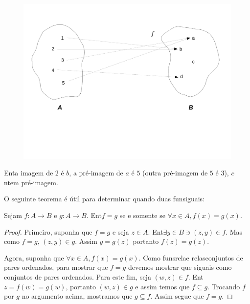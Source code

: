 \begin{figure}[h]
\begin{center}
\includegraphics[width=12cm,trim={0.9cm 6.4cm 0.9cm 2.7cm},clip]{./figuras/figure26.pdf}
\end{center}
\end{figure}

Ent\ao a imagem de $2$ \'e $b$, a pr\'e-imagem de $a$ \'e $5$ (outra pr\'e-imagem de $5$ \'e $3$), $c$ n\ao tem pr\'e-imagem.

O seguinte teorema \'e \'util para determinar quando duas fun\coes s\ao iguais:
\begin{teob}
Sejam $f:A\to B$ e $g:A\to B$. Ent\ao $f=g$ se e somente se $\forall x\in A, f(x)=g(x)$.
\end{teob}
\begin{proof}
Primeiro, suponha que $f=g$ e seja $z\in A$. Ent\ao $\exists y\in B\ni (z,y)\in f$. Mas como $f=g$, $(z,y)\in g$. Assim $y=g(z)$ portanto $f(z)=g(z)$.

Agora, suponha que $\forall x\in A, f(x)=g(x)$. Como fun\coes s\ao rela\coes e rela\coes s\ao conjuntos de pares ordenados, para mostrar que $f=g$ devemos mostrar que s\ao iguais como conjuntos de pares ordenados. Para este fim, seja $(w,z)\in f$. Ent\ao $z=f(w)=g(w)$, portanto $(w,z)\in g$ e assim temos que $f\subseteq g$. Trocando $f$ por $g$ no argumento acima, mostramos que $g\subseteq f$. Assim segue que $f=g$. 
\end{proof}
\\

